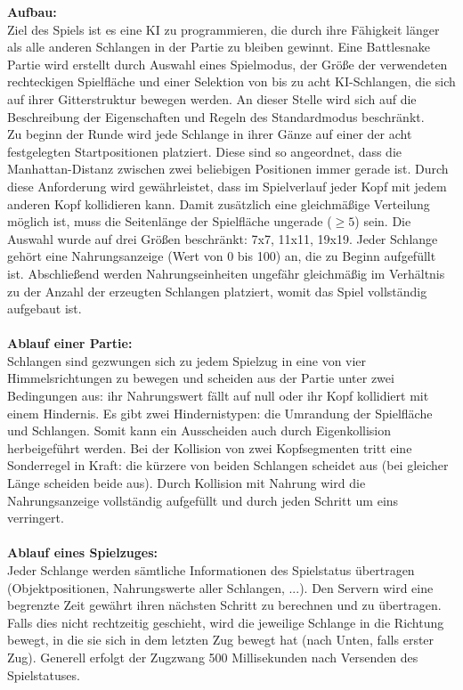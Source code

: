 \documentclass[a4paper,12pt]{article} %
\begin{document}
\textbf{Aufbau:}\\
Ziel des Spiels ist es eine KI zu programmieren, die durch ihre Fähigkeit länger als alle anderen Schlangen in der Partie zu bleiben gewinnt. Eine Battlesnake Partie wird erstellt durch Auswahl eines Spielmodus, der Größe der verwendeten rechteckigen Spielfläche und einer Selektion von bis zu acht KI-Schlangen, die sich auf ihrer Gitterstruktur bewegen werden. An dieser Stelle wird sich auf die Beschreibung der Eigenschaften und Regeln des Standardmodus beschränkt.\\
Zu beginn der Runde wird jede Schlange in ihrer Gänze auf einer der acht festgelegten Startpositionen platziert. Diese sind so angeordnet, dass die Manhattan-Distanz zwischen zwei beliebigen Positionen immer gerade ist. Durch diese Anforderung wird gewährleistet, dass im Spielverlauf jeder Kopf mit jedem anderen Kopf kollidieren kann. Damit zusätzlich eine gleichmäßige Verteilung möglich ist, muss die Seitenlänge der Spielfläche ungerade ($\geq 5$) sein. Die Auswahl wurde auf drei Größen beschränkt: 7x7, 11x11, 19x19. Jeder Schlange gehört eine Nahrungsanzeige (Wert von 0 bis 100) an, die zu Beginn aufgefüllt ist. Abschließend werden Nahrungseinheiten ungefähr gleichmäßig im Verhältnis zu der Anzahl der erzeugten Schlangen platziert, womit das Spiel vollständig aufgebaut ist.\\
\\
\textbf{Ablauf einer Partie:}\\
Schlangen sind gezwungen sich zu jedem Spielzug in eine von vier Himmelsrichtungen zu bewegen und scheiden aus der Partie unter zwei Bedingungen aus: ihr Nahrungswert fällt auf null oder ihr Kopf kollidiert mit einem Hindernis. Es gibt zwei Hindernistypen: die Umrandung der Spielfläche und Schlangen. Somit kann ein Ausscheiden auch durch Eigenkollision herbeigeführt werden. Bei der Kollision von zwei Kopfsegmenten tritt eine Sonderregel in Kraft: die kürzere von beiden Schlangen scheidet aus (bei gleicher Länge scheiden beide aus). Durch Kollision mit Nahrung wird die Nahrungsanzeige vollständig aufgefüllt und durch jeden Schritt um eins verringert.\\
\\
\textbf{Ablauf eines Spielzuges:}\\
Jeder Schlange werden sämtliche Informationen des Spielstatus übertragen (Objektpositionen, Nahrungswerte aller Schlangen, ...). Den Servern wird eine begrenzte Zeit gewährt ihren nächsten Schritt zu berechnen und zu übertragen. Falls dies nicht rechtzeitig geschieht, wird die jeweilige Schlange in die Richtung bewegt, in die sie sich in dem letzten Zug bewegt hat (nach Unten, falls erster Zug). Generell erfolgt der Zugzwang 500 Millisekunden nach Versenden des Spielstatuses.\\
\end{document}
